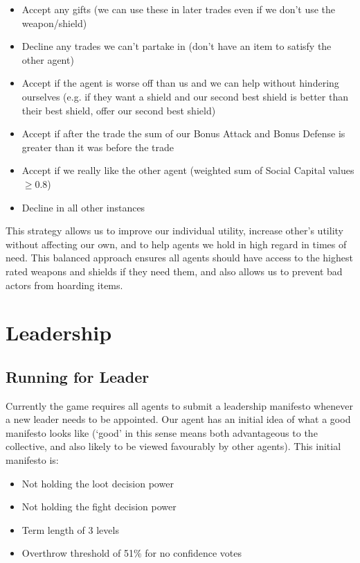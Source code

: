 \begin{itemize}
    \item Accept any gifts (we can use these in later trades even if we don't use the weapon/shield)
    \item Decline any trades we can't partake in (don't have an item to satisfy the other agent)
    \item Accept if the agent is worse off than us and we can help without hindering ourselves (e.g. if they want a shield and our second best shield is better than their best shield, offer our second best shield)
    \item Accept if after the trade the sum of our Bonus Attack and Bonus Defense is greater than it was before the trade
    \item Accept if we really like the other agent (weighted sum of Social Capital values $\geq 0.8$)
    \item Decline in all other instances
\end{itemize}

This strategy allows us to improve our individual utility, increase other's utility without affecting our own, and to help agents we hold in high regard in times of need. This balanced approach ensures all agents should have access to the highest rated weapons and shields if they need them, and also allows us to prevent bad actors from hoarding items.

\section{Leadership}

\subsection{Running for Leader}\label{T6RunningForLeader}

Currently the game requires all agents to submit a leadership manifesto whenever a new leader needs to be appointed. Our agent has an initial idea of what a good manifesto looks like (`good' in this sense means both advantageous to the collective, and also likely to be viewed favourably by other agents). This initial manifesto is:

\begin{itemize}
    \item Not holding the loot decision power
    \item Not holding the fight decision power
    \item Term length of 3 levels
    \item Overthrow threshold of 51\% for no confidence votes
\end{itemize}

